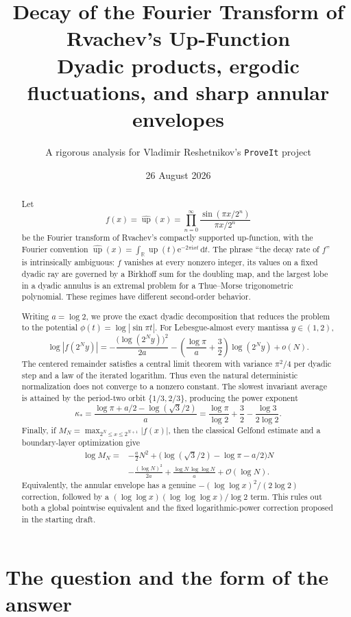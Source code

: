 \documentclass[11pt,oneside]{article}
\title{\bfseries Decay of the Fourier Transform of Rvachev's Up-Function\\[0.35em]
\large Dyadic products, ergodic fluctuations, and sharp annular envelopes}
\author{A rigorous analysis for Vladimir Reshetnikov's \texttt{ProveIt} project}
\date{26 August 2026}
\theoremstyle{definition}
\theoremstyle{remark}
\newcommand{\R}{\mathbb R}
\newcommand{\e}{\mathrm e}
\newcommand{\ii}{\mathrm i}
\newcommand{\dd}{\,\mathrm d}
\newcommand{\Up}{\operatorname{up}}
\newcommand{\bigO}{\mathcal O}
\newcommand{\smallo}{o}
\begin{document}
\maketitle

\begin{abstract}
Let
\[
 f(x)=\widehat{\Up}(x)
 =\prod_{n=0}^{\infty}\frac{\sin(\pi x/2^n)}{\pi x/2^n}
\]
be the Fourier transform of Rvachev's compactly supported up-function, with the
Fourier convention $\widehat{\Up}(x)=\int_{\R}\Up(t)\e^{-2\pi\ii xt}\dd t$.
The phrase ``the decay rate of $f$'' is intrinsically ambiguous: $f$ vanishes at
every nonzero integer, its values on a fixed dyadic ray are governed by a
Birkhoff sum for the doubling map, and the largest lobe in a dyadic annulus is
an extremal problem for a Thue--Morse trigonometric polynomial.  These regimes
have different second-order behavior.

Writing $a=\log 2$, we prove the exact dyadic decomposition that reduces the
problem to the potential $\phi(t)=\log|\sin\pi t|$.  For Lebesgue-almost every
mantissa $y\in(1,2)$,
\[
 \log|f(2^Ny)|
 =-\frac{\bigl(\log(2^Ny)\bigr)^2}{2a}
  -\left(\frac{\log\pi}{a}+\frac32\right)\log(2^Ny)
  +\smallo(N).
\]
The centered remainder satisfies a central limit theorem with variance
$\pi^2/4$ per dyadic step and a law of the iterated logarithm.  Thus even the
natural deterministic normalization does not converge to a nonzero constant.
The slowest invariant average is attained by the period-two orbit
$\{1/3,2/3\}$, producing the power exponent
\[
 \kappa_*=\frac{\log\pi+a/2-\log(\sqrt3/2)}{a}
 =\frac{\log\pi}{\log2}+\frac32-\frac{\log3}{2\log2}.
\]
Finally, if
$M_N=\max_{2^N\le x\le2^{N+1}}|f(x)|$, then the classical Gelfond estimate and
a boundary-layer optimization give
\[
 \begin{split}
 \log M_N={}&-\frac a2N^2
 +\bigl(\log(\sqrt3/2)-\log\pi-a/2\bigr)N\\
 &-\frac{(\log N)^2}{2a}
 +\frac{\log N\,\log\log N}{a}
 +\bigO(\log N).
 \end{split}
\]
Equivalently, the annular envelope has a genuine
$-(\log\log x)^2/(2\log2)$ correction, followed by a
$(\log\log x)(\log\log\log x)/\log2$ term.  This rules out both a global
pointwise equivalent and the fixed logarithmic-power correction proposed in
the starting draft.
\end{abstract}

\tableofcontents
\newpage

\section{The question and the form of the answer}
\end{document}
